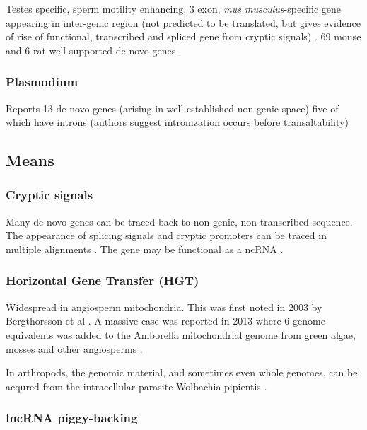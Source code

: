     Testes specific, sperm motility enhancing, 3 exon, \textit{mus
    musculus}-specific gene appearing in inter-genic region (not predicted
    to be translated, but gives evidence of rise of functional, transcribed
    and spliced gene from cryptic signals) \cite{heinen_emergence_2009}. 69
    mouse and 6 rat well-supported de novo genes \cite{murphy_novo_2012}.

\subsubsection{Plasmodium}

    Reports 13 de novo genes (arising in well-established non-genic space)
    five of which have introns (authors suggest intronization occurs before
    transaltability) \cite{yang_novo_2011}

\subsection{Means}

\subsubsection{Cryptic signals} 

    Many de novo genes can be traced back to non-genic, non-transcribed
    sequence. The appearance of splicing signals and cryptic promoters can
    be traced in multiple alignments \cite{heinen_emergence_2009,
    yang_novo_2011, knowles_recent_2009}. The gene may be functional as a
    ncRNA \cite{heinen_emergence_2009}.

\subsubsection{Horizontal Gene Transfer (HGT)}

    Widespread in angiosperm mitochondria. This was first noted in 2003 by
    Bergthorsson et al \cite{bergthorsson_widespread_2003}. A massive case was
    reported in 2013 where 6 genome equivalents was added to the Amborella
    mitochondrial genome from green algae, mosses and other angiosperms
    \cite{rice_horizontal_2013}.

    In arthropods, the genomic material, and sometimes even whole genomes, can
    be acqured from the intracellular parasite Wolbachia pipientis
    \cite{hotopp_widespread_2007}.

\subsubsection{lncRNA piggy-backing}

